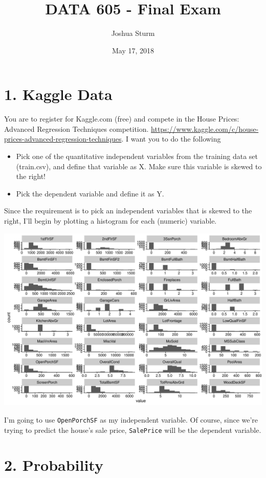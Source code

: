 \documentclass[]{article}
\title{DATA 605 - Final Exam}
\author{Joshua Sturm}
\date{May 17, 2018}
\begin{document}
\maketitle

\hypertarget{kaggle-data}{%
\section{1. Kaggle Data}\label{kaggle-data}}

You are to register for Kaggle.com (free) and compete in the House
Prices: Advanced Regression Techniques competition.
\url{https://www.kaggle.com/c/house-prices-advanced-regression-techniques}.
I want you to do the following

\begin{itemize}
\item
  Pick one of the quantitative independent variables from the training
  data set (train.csv), and define that variable as X. Make sure this
  variable is skewed to the right!
\item
  Pick the dependent variable and define it as Y.
\end{itemize}

Since the requirement is to pick an independent variables that is skewed
to the right, I'll begin by plotting a histogram for each (numeric)
variable.

\includegraphics{DATA_605_Final_Exam_files/figure-latex/train-histogram-1.pdf}

I'm going to use \texttt{OpenPorchSF} as my independent variable. Of
course, since we're trying to predict the house's sale price,
\texttt{SalePrice} will be the dependent variable.

\hypertarget{probability}{%
\section{2. Probability}\label{probability}}
\end{document}
